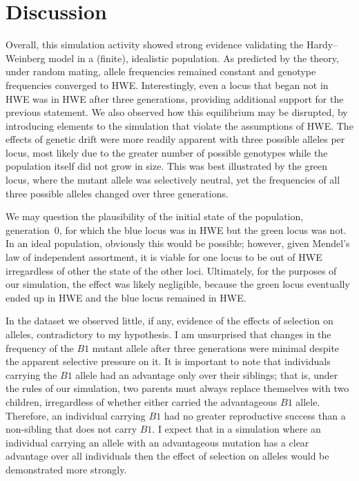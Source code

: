 \documentclass{article}
\begin{document}
    \section*{Discussion}

        Overall, this simulation activity showed strong evidence validating the
            Hardy--Weinberg model in a (finite), idealistic population.
        As predicted by the theory, under random mating, allele frequencies
            remained constant and genotype frequencies converged to \ac{HWE}.
        Interestingly, even a locus that began not in \ac{HWE} was in \ac{HWE}
            after three generations, providing additional support for the
            previous statement.
        We also observed how this equilibrium may be disrupted, by introducing
            elements to the simulation that violate the assumptions of
            \ac{HWE}.
        The effects of genetic drift were more readily apparent with three
            possible alleles per locus, most likely due to the greater number
            of possible genotypes while the population itself did not grow in
            size.
        This was best illustrated by the green locus, where the mutant allele
            was selectively neutral, yet the frequencies of all three possible
            alleles changed over three generations.

        We may question the plausibility of the initial state of the
            population, generation~0, for which the blue locus was in
            \ac{HWE} but the green locus was not.
        In an ideal population, obviously this would be possible; however,
            given Mendel's law of independent assortment, it is viable for one
            locus to be out of \ac{HWE} irregardless of other the state of the
            other loci.
        Ultimately, for the purposes of our simulation, the effect was likely
            negligible, because the green locus eventually ended up in \ac{HWE}
            and the blue locus remained in \ac{HWE}.

        In the dataset we observed little, if any, evidence of the effects of
            selection on alleles, contradictory to my hypothesis.
        I am unsurprised that changes in the frequency of the $B1$ mutant
            allele after three generations were minimal despite the apparent
            selective pressure on it.
        It is important to note that individuals carrying the $B1$ allele had
            an advantage only over their siblings; that is, under the rules of
            our simulation, two parents must always replace themselves with two
            children, irregardless of whether either carried the advantageous
            $B1$ allele.
        Therefore, an individual carrying $B1$ had no greater reproductive
            success than a non-sibling that does not carry $B1$.
        I expect that in a simulation where an individual carrying an allele
            with an advantageous mutation has a clear advantage over all
            individuals then the effect of selection on alleles would be
            demonstrated more strongly.

    \printbibliography
\end{document}
